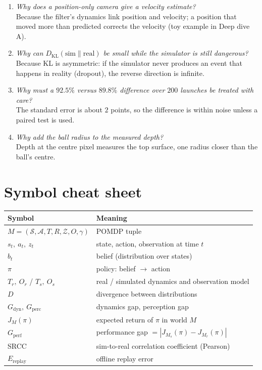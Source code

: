 \documentclass[11pt,a4paper]{article}
\begin{document}
\begin{enumerate}[label=\textbf{Q\arabic*.}]
The update step (it uses the measurement) lowers it; the predict step (it uses imperfect dynamics) raises it.
\item \emph{Why does a position-only camera give a velocity estimate?}\\
Because the filter's dynamics link position and velocity; a position that moved more than predicted corrects the velocity (toy example in Deep dive A).
\item \emph{Why can $D_{\mathrm{KL}}(\text{sim}\|\text{real})$ be small while the simulator is still dangerous?}\\
Because KL is asymmetric: if the simulator never produces an event that happens in reality (dropout), the reverse direction is infinite.
\item \emph{Why must a $92.5\%$ versus $89.8\%$ difference over $200$ launches be treated with care?}\\
The standard error is about $2$ points, so the difference is within noise unless a paired test is used.
\item \emph{Why add the ball radius to the measured depth?}\\
Depth at the centre pixel measures the top surface, one radius closer than the ball's centre.
\end{enumerate}

\appendix
\section{Symbol cheat sheet}
\begin{center}
\renewcommand{\arraystretch}{1.2}
\begin{tabularx}{\textwidth}{@{}l X@{}}
\toprule
Symbol & Meaning \\
\midrule
$M=(\mathcal S,\mathcal A,T,R,\mathcal Z,O,\gamma)$ & POMDP tuple \\
$s_t,\ a_t,\ z_t$ & state, action, observation at time $t$ \\
$b_t$ & belief (distribution over states) \\
$\pi$ & policy: belief $\to$ action \\
$T_r,\ O_r$ / $T_s,\ O_s$ & real / simulated dynamics and observation model \\
$D$ & divergence between distributions \\
$G_{\mathrm{dyn}},\ G_{\mathrm{perc}}$ & dynamics gap, perception gap \\
$J_M(\pi)$ & expected return of $\pi$ in world $M$ \\
$G_{\mathrm{perf}}$ & performance gap $=|J_{M_s}(\pi)-J_{M_r}(\pi)|$ \\
SRCC & sim-to-real correlation coefficient (Pearson) \\
$E_{\mathrm{replay}}$ & offline replay error \\
\bottomrule
\end{tabularx}
\end{center}
\end{document}

